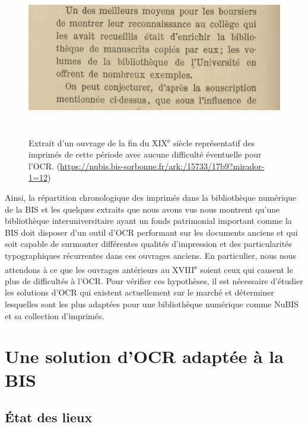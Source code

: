 \documentclass[a4paper,12pt,twoside]{book}
\begin{document}
\begin{figure} [H]
	\includegraphics[width=6.26806in,height=2.63889in]{vertopal_157ae480aa4a4b07be198b586a812241/media/image11.png}
	\caption{Extrait d'un ouvrage de la fin du XIX\textsuperscript{e}
		siècle représentatif des imprimés de cette période avec aucune
		difficulté éventuelle pour l'OCR.
		(\url{https://nubis.bis-sorbonne.fr/ark:/15733/17b9?mirador-1=12})}
\end{figure}




Ainsi, la répartition chronologique des imprimés dans la bibliothèque
numérique de la BIS et les quelques extraits que nous avons vus nous
montrent qu'une bibliothèque interuniversitaire ayant un fonds patrimonial
important comme la BIS doit disposer d'un outil d'OCR performant sur les
documents anciens et qui soit capable de surmonter différentes qualités
d'impression et des particularités typographiques récurrentes dans ces
ouvrages anciens. En particulier, nous nous attendons à ce que les
ouvrages antérieurs au XVIII\textsuperscript{e} soient ceux qui causent
le plus de difficultés à l'OCR. Pour vérifier ces hypothèses, il est
nécessaire d'étudier les solutions d'OCR qui existent actuellement sur
le marché et déterminer lesquelles sont les plus adaptées pour une
bibliothèque numérique comme NuBIS et sa collection d'imprimés.












	
	\chapter{Une solution d'OCR adaptée à la BIS}
	
	\section{État des lieux}
	
\end{document}
